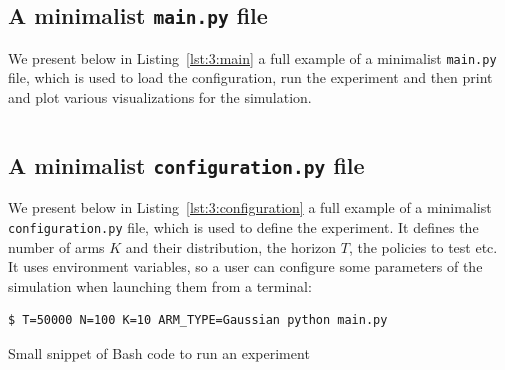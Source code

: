 \subsection{A minimalist \texttt{main.py} file}

We present below in Listing~\ref{lst:3:main} a full example of a minimalist \texttt{main.py} file,
which is used to load the configuration, run the experiment and then print and plot various visualizations for the simulation.

\begin{small}
    \inputminted[linenos=true,numbersep=5pt,frame=lines,framesep=2mm]{python3}{2-Chapters/3-Chapter/src/example_of_main_singleplayer.py}
\end{small}


\subsection{A minimalist \texttt{configuration.py} file}

We present below in Listing~\ref{lst:3:configuration} a full example of a minimalist \texttt{configuration.py} file,
which is used to define the experiment.
It defines the number of arms $K$ and their distribution, the horizon $T$, the policies to test etc.
It uses environment variables, so a user can configure some parameters of the simulation when launching them from a terminal:


\begin{listing}[h!]
    \begin{verbatim}
$ T=50000 N=100 K=10 ARM_TYPE=Gaussian python main.py
    \end{verbatim}
    \caption{Small snippet of Bash code to run an experiment}
    \label{lst:3:howToRunExperiment2}
\end{listing}


